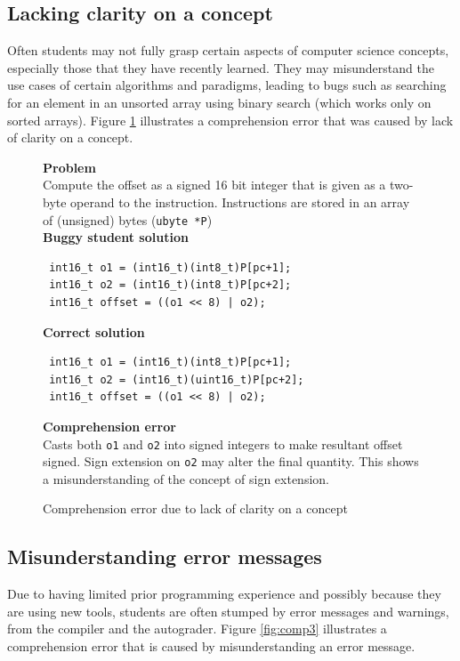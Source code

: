 \documentclass{sig-alternate}
\begin{document}
\subsection{Lacking clarity on a concept}
\label{sec:comp2}
Often students may not fully grasp certain aspects of computer science concepts, especially those that they have recently learned. They may misunderstand the use cases of certain algorithms and paradigms, leading to bugs such as searching for an element in an unsorted array using binary search (which works only on sorted arrays). Figure \ref{fig:comp2} illustrates a comprehension error that was caused by lack of clarity on a concept.

\begin{figure}
\begin{framed}
\setlength{\parindent}{0cm}
\textbf{Problem}\\
Compute the offset as a signed 16 bit integer that is given as a two-byte operand	to the instruction. Instructions are stored in an array of (unsigned) bytes (\verb|ubyte *P|) \\

\textbf{Buggy student solution}
\vspace{-0.05in}
\begin{verbatim}
 int16_t o1 = (int16_t)(int8_t)P[pc+1];
 int16_t o2 = (int16_t)(int8_t)P[pc+2];
 int16_t offset = ((o1 << 8) | o2);
\end{verbatim}

\textbf{Correct solution}
\vspace{-0.05in}
\begin{verbatim}
 int16_t o1 = (int16_t)(int8_t)P[pc+1];
 int16_t o2 = (int16_t)(uint16_t)P[pc+2];
 int16_t offset = ((o1 << 8) | o2);
\end{verbatim}

\textbf{Comprehension error}\\
Casts both \verb|o1| and \verb|o2| into signed integers to make resultant offset signed. Sign extension on \verb|o2| may alter the final quantity. This shows a misunderstanding of the concept of sign extension.

\end{framed}
\vspace{-0.1in}
\caption{Comprehension error due to lack of clarity on a concept}
\label{fig:comp2}
\end{figure}

\subsection{Misunderstanding error messages}
Due to having limited prior programming experience and possibly because they are using new tools, students are often stumped by error messages and warnings, from the compiler and the autograder. Figure \ref{fig:comp3} illustrates a comprehension error that is caused by misunderstanding an error message.
\end{document}
